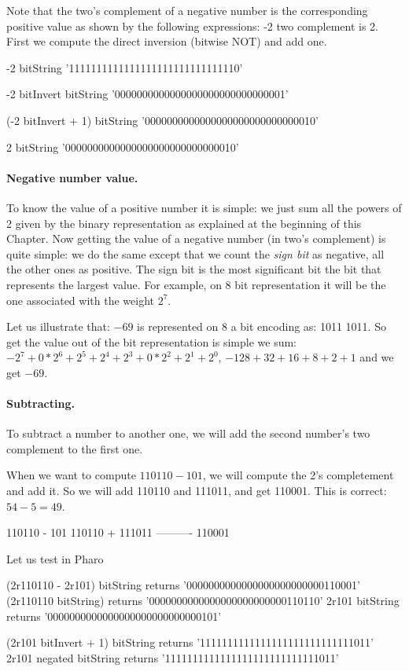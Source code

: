 \documentclass[a4paper,10pt,twoside]{book}
\begin{document}
Note that the two's complement of a negative number is the corresponding positive value as shown by the following expressions: -2 two complement is 2. First we compute the direct inversion (bitwise NOT) and add one. 

\begin{code}{}
-2 bitString 
	'1111111111111111111111111111110'
	
-2 bitInvert bitString  
	'0000000000000000000000000000001'
	
(-2 bitInvert + 1) bitString   
	'0000000000000000000000000000010'

2 bitString 
	'0000000000000000000000000000010'
\end{code}

\paragraph{Negative number value.}
To know the value of a positive number it is simple: we just sum all the powers of 2 given by the binary representation as explained at the beginning of this Chapter. Now getting the value of a negative number (in two's complement) is quite simple: we do the same except that we count the \emph{sign bit} as negative, all the other ones as positive. The sign bit is the most significant bit \ie the bit that represents the largest value. For example, on 8 bit representation it will be the one associated with the weight $2^{7}$.

Let us illustrate that: 
$-69$ is represented on 8 a bit encoding as: 1011 1011. So get the value out of the bit representation is simple we sum: $-2^7 + 0*2^6 + 2^5 + 2^4 + 2^3 + 0*2^2 + 2^1 + 2^0$, \ie $-128 + 32 + 16 + 8 + 2 + 1$ and we get $-69$. 


\paragraph{Subtracting.}
To subtract a number to another one, we will add the second number's two complement to the first one.

When we want to compute $110110 - 101$, we will compute the 2's completement and add it. 
So we will add 110110 and 111011, and get 110001. This is correct: $54 - 5 = 49$.


\begin{code}{}
110110 - 101
   110110
+ 111011
----------
   110001
\end{code}

Let us test in Pharo
\begin{code}{}
(2r110110 - 2r101) bitString	
	returns '0000000000000000000000000110001'
(2r110110 bitString) 	
	returns '0000000000000000000000000110110'
2r101 bitString
	returns '0000000000000000000000000000101'		
							
(2r101 bitInvert + 1) bitString
	returns '1111111111111111111111111111011'	
2r101 negated bitString
	returns '1111111111111111111111111111011'	
\end{code}
	
\end{document}

